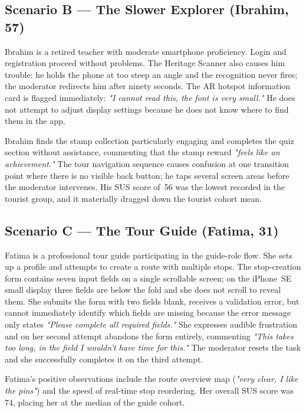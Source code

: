 \subsection*{Scenario B — The Slower Explorer (Ibrahim, 57)}

Ibrahim is a retired teacher with moderate smartphone proficiency. Login and registration
proceed without problems. The Heritage Scanner also causes him trouble: he holds the
phone at too steep an angle and the recognition never fires; the moderator redirects him
after ninety seconds. The AR hotspot information card is flagged immediately: \textit{"I
cannot read this, the font is very small."} He does not attempt to adjust display
settings because he does not know where to find them in the app.

Ibrahim finds the stamp collection particularly engaging and completes the quiz section
without assistance, commenting that the stamp reward \textit{"feels like an achievement."}
The tour navigation sequence causes confusion at one transition point where there is no
visible back button; he taps several screen areas before the moderator intervenes. His
SUS score of~56 was the lowest recorded in the tourist group, and it materially dragged
down the tourist cohort mean.

\subsection*{Scenario C — The Tour Guide (Fatima, 31)}

Fatima is a professional tour guide participating in the guide-role flow. She sets up a
profile and attempts to create a route with multiple stops. The stop-creation form
contains seven input fields on a single scrollable screen; on the iPhone~SE small display
three fields are below the fold and she does not scroll to reveal them. She submits the
form with two fields blank, receives a validation error, but cannot immediately identify
which fields are missing because the error message only states \textit{"Please complete
all required fields."} She expresses audible frustration and on her second attempt
abandons the form entirely, commenting \textit{"This takes too long, in the field I
wouldn't have time for this."} The moderator resets the task and she successfully
completes it on the third attempt.

Fatima's positive observations include the route overview map (\textit{"very clear, I
like the pins"}) and the speed of real-time stop reordering. Her overall SUS score was
74, placing her at the median of the guide cohort.

